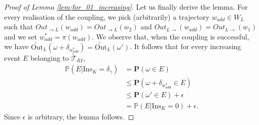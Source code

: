 \documentclass[12pt,a4paper]{article}
\newcommand{\1}[1]{{\mathbf 1}{\{#1\}}}
\newcommand{\8}{{\infty}}
\newcommand{\p}{\mathbb{P}}
\newcommand{\Out}{\mathrm{Out}}
\newcommand{\In}{\mathrm{Ins}}
\newcommand{\Hin}{\mathrm{Hin}}
\begin{document}
\begin{proof}[Proof of Lemma \ref{lem:for_01_increasing}]




\medskip

Let us finally derive the lemma. For every realisation of the coupling, we pick (arbitrarily) a trajectory $w_{add} \in W_L$ such that $Out_{\to L}(w_{add})=Out_{\to L}(w_2) $ and $Out_{L \to}(w_{add})=Out_{L \to}(w_1) $ and we set $w_{add}^* =\pi(w_{add})$. 
We observe that, when the coupling is successful, we have $\widetilde{\Out}_L(\omega +\delta_{w_{add}^*})= \widetilde{\Out}_L(\omega')$. It follows that for every increasing event $E$ belonging to $\widetilde{\mathcal{T}}_{RI}$,
\begin{equation}
  \begin{aligned}
    \p(E | \In_K=\delta_\gamma) 
    & = \mathbf{P}(\omega  \in E)\\
    & \le \mathbf{P}(\omega +\delta_{w_{add}^*} \in E)\\
    & \le \mathbf{P}(\omega' \in E) + \epsilon\\
    & = \p(E| \In_K=0) +\epsilon.
  \end{aligned}
\end{equation}
Since $\epsilon$ is arbitrary, the lemma follows.
\end{proof}
\end{document}
